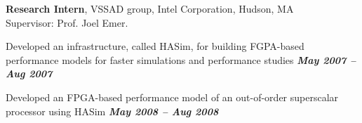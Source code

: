 \documentclass[margin,line]{resume}
\begin{document}
\begin{resume}
    \vspace{-7mm}
    \textbf{Research Intern}, VSSAD group, Intel Corporation, Hudson, MA\\
    Supervisor: Prof. Joel Emer.
    \begin{list2}
    \item Developed an infrastructure, called HASim, for building FGPA-based performance
          models for faster simulations and performance studies
                            \hfill \textbf{\textit{May 2007 -- Aug 2007}}\\
    \vspace{-3mm}
    \item Developed an FPGA-based performance model of an out-of-order superscalar processor using HASim \hfill
    \textbf{\textit{May 2008 -- Aug 2008}}\\
    \end{list2}

    \vspace{-9mm}

\end{resume}
\end{document}
